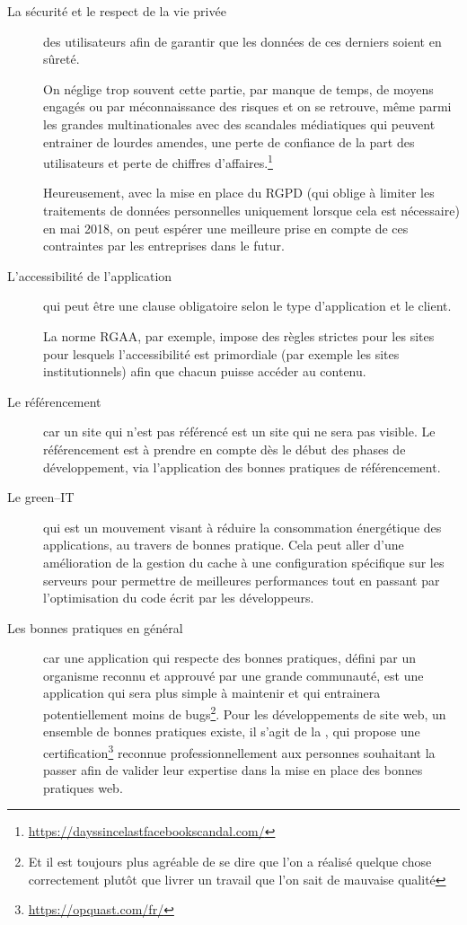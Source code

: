 \begin{description}
	\item [La sécurité et le respect de la vie privée] des utilisateurs afin de garantir que les données de ces derniers soient en sûreté. 
	
	On néglige trop souvent cette partie, par manque de temps, de moyens engagés ou par méconnaissance des risques et on se retrouve, même parmi les grandes multinationales avec des scandales médiatiques qui peuvent entrainer de lourdes amendes, une perte de confiance de la part des utilisateurs et perte de chiffres d'affaires.\footnote{\url{https://dayssincelastfacebookscandal.com/}}
	
	Heureusement, avec la mise en place du \gls{RGPD} (qui oblige à limiter les traitements de données personnelles uniquement lorsque cela est nécessaire) en mai 2018, on peut espérer une meilleure prise en compte de ces contraintes par les entreprises dans le futur.
	\item [L'accessibilité de l'application] qui peut être une clause obligatoire selon le type d'application et le client.
	
	La norme \gls{RGAA}, par exemple, impose des règles strictes pour les sites pour lesquels l'accessibilité est primordiale (par exemple les sites institutionnels) afin que chacun puisse accéder au contenu.
	\item [Le référencement] car un site qui n'est pas référencé est un site qui ne sera pas visible. Le référencement est à prendre en compte dès le début des phases de développement, via l'application des bonnes pratiques de référencement.
	\item [Le green--IT] qui est un mouvement visant à réduire la consommation énergétique des applications, au travers de bonnes pratique. Cela peut aller d'une amélioration de la gestion du cache à une configuration spécifique sur les serveurs pour permettre de meilleures performances tout en passant par l'optimisation du code écrit par les développeurs.
	\item [Les bonnes pratiques en général] car une application qui respecte des bonnes pratiques, défini par un organisme reconnu et approuvé par une grande communauté, est une application qui sera plus simple à maintenir et qui entrainera potentiellement moins de bugs\footnote{Et il est toujours plus agréable de se dire que l'on a réalisé quelque chose correctement plutôt que livrer un travail que l'on sait de mauvaise qualité}. Pour les développements de site web, un ensemble de bonnes pratiques existe, il s'agit de la  \cite{opquast-best-practices}, qui propose une certification\footnote{\url{https://opquast.com/fr/}} reconnue professionnellement aux personnes souhaitant la passer afin de valider leur expertise dans la mise en place des bonnes pratiques web.
\end{description}

